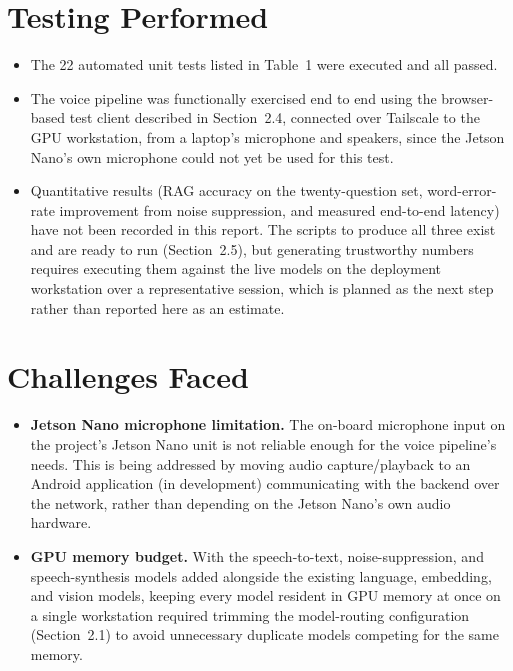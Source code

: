 \documentclass[11pt,a4paper]{article}
\begin{document}
\section{Testing Performed}

\begin{itemize}
    \item The 22 automated unit tests listed in Table~1 were executed and all passed.
    \item The voice pipeline was functionally exercised end to end using the browser-based test client described in Section~2.4, connected over Tailscale to the GPU workstation, from a laptop's microphone and speakers, since the Jetson Nano's own microphone could not yet be used for this test.
    \item Quantitative results (RAG accuracy on the twenty-question set, word-error-rate improvement from noise suppression, and measured end-to-end latency) have not been recorded in this report. The scripts to produce all three exist and are ready to run (Section~2.5), but generating trustworthy numbers requires executing them against the live models on the deployment workstation over a representative session, which is planned as the next step rather than reported here as an estimate.
\end{itemize}

\section{Challenges Faced}

\begin{itemize}
    \item \textbf{Jetson Nano microphone limitation.} The on-board microphone input on the project's Jetson Nano unit is not reliable enough for the voice pipeline's needs. This is being addressed by moving audio capture/playback to an Android application (in development) communicating with the backend over the network, rather than depending on the Jetson Nano's own audio hardware.
    \item \textbf{GPU memory budget.} With the speech-to-text, noise-suppression, and speech-synthesis models added alongside the existing language, embedding, and vision models, keeping every model resident in GPU memory at once on a single workstation required trimming the model-routing configuration (Section~2.1) to avoid unnecessary duplicate models competing for the same memory.
\end{itemize}
\end{document}
